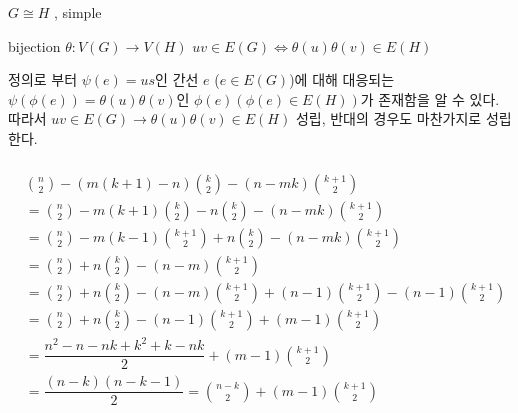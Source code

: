 \documentclass{oblivoir}
\begin{document}
\subsubsection{}
\subsubsection{}
\subsubsection{} %
$G \cong H$ , simple

bijection $\theta : V(G) \longrightarrow V(H)$
$ uv \in E(G) \Leftrightarrow  \theta(u)\theta(v) \in E(H)$

정의로 부터 $\psi(e) = us$인 간선 $e$ ($e \in E(G)$)에 대해 대응되는 $\psi(\phi(e)) = \theta(u)\theta(v)$인 $\phi(e)(\phi(e) \in E(H))$가 존재함을 알 수 있다. 
따라서 $ uv \in E(G) \rightarrow \theta(u)\theta(v) \in E(H)$ 성립, 반대의 경우도 마찬가지로 성립한다.

\subsubsection{}
\subsubsection{}
\subsubsection{}
\subsubsection{}%

\begin{align}
&{n \choose 2} -  (m(k+1)-n) {k \choose 2} -(n-mk){k+1 \choose 2} \\
&= {n \choose 2} -  m(k+1){k \choose 2}-n{k \choose 2} -(n-mk){k+1 \choose 2} \\
&= {n \choose 2} -  m(k-1){k+1 \choose 2} +n{k \choose 2} -(n-mk){k+1 \choose 2} \\
&= {n \choose 2} + n{k \choose 2} -(n-m){k+1 \choose 2} \\
&= {n \choose 2} + n{k \choose 2} -(n-m){k+1 \choose 2} +(n-1){k+1 \choose 2} - (n-1){k+1 \choose 2}\\
&= {n \choose 2} + n{k \choose 2} - (n-1){k+1 \choose 2} + (m-1){k+1 \choose 2}  \\
&= \dfrac{n^2-n-nk + k^2+k-nk}{2}  + (m-1){k+1 \choose 2} \\
&= \dfrac{(n-k)(n-k-1)}{2}={n-k \choose 2}  + (m-1){k+1 \choose 2}
\end{align}
\end{document}
